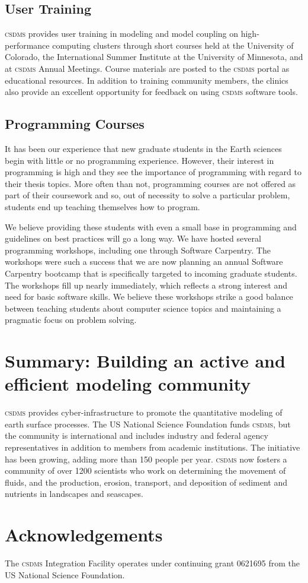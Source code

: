 \documentclass[11pt, oneside]{amsart}
\DeclareRobustCommand{\csdms}{\textsc{csdms}}
\begin{document}
\subsection{User Training}

\csdms{} provides user training in modeling and model coupling
on high-performance computing clusters
through short courses held at 
the University of Colorado,
the International Summer Institute at the University of Minnesota,
and at \csdms{} Annual Meetings.
Course materials are posted to the \csdms{} portal as educational resources.
In addition to training community members,
the clinics also provide an excellent opportunity 
for feedback on using \csdms{} software tools.

\subsection{Programming Courses}

It has been our experience that new graduate students in the Earth
sciences begin with little or no programming experience. However,
their interest in programming is high and they see the importance of
programming with regard to their thesis topics. More often than not,
programming courses are not offered as part of their coursework and
so, out of necessity to solve a particular problem, students end up
teaching themselves how to program.

We believe providing these students with even a small base in programming 
and guidelines on best practices will go a long way. We have
hosted several programming workshops, including one through Software
Carpentry. The workshops were such a success that we are now planning
an annual Software Carpentry bootcamp that is specifically targeted
to incoming graduate students. The workshops fill up nearly
immediately, which reflects a strong interest and need for basic
software skills. We believe these workshops strike a good balance
between teaching students about computer science topics and
maintaining a pragmatic focus on problem solving.

\section{Summary: Building an active and efficient modeling community}

\csdms{} provides cyber-infrastructure to promote the quantitative modeling of
earth surface processes. The US National Science Foundation funds \csdms{}, but
the community is international and includes industry and federal agency
representatives in addition to members from academic institutions. The
initiative has been growing, adding more than 150 people per year. \csdms{} now
fosters a community of over 1200 scientists who work on determining
the movement of fluids, and the production, erosion, transport, and
deposition of sediment and nutrients in landscapes and seascapes. 

\section{Acknowledgements}

The \csdms{} Integration Facility operates under continuing grant 0621695
from the US National Science Foundation.



{}
\end{document}
